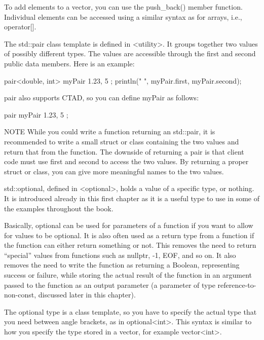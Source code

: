 To add elements to a vector, you can use the push\_back() member function. Individual elements can be accessed using a similar syntax as for arrays, i.e., operator[].


The std::pair class template is defined in <utility>. It groups together two values of possibly different types. The values are accessible through the first and second public data members. Here is an example:

\begin{cpp}
pair<double, int> myPair { 1.23, 5 };
println("{} {}", myPair.first, myPair.second);
\end{cpp}

pair also supports CTAD, so you can define myPair as follows:

\begin{cpp}
pair myPair { 1.23, 5 };
\end{cpp}

\begin{myNotic}{NOTE}
While you could write a function returning an std::pair, it is recommended to write a small struct or class containing the two values and return that from the function. The downside of returning a pair is that client code must use first and second to access the two values. By returning a proper struct or class, you can give more meaningful names to the two values.
\end{myNotic}


std::optional, defined in <optional>, holds a value of a specific type, or nothing. It is introduced already in this first chapter as it is a useful type to use in some of the examples throughout the book.

Basically, optional can be used for parameters of a function if you want to allow for values to be optional. It is also often used as a return type from a function if the function can either return something or not. This removes the need to return “special” values from functions such as nullptr, -1, EOF, and so on. It also removes the need to write the function as returning a Boolean, representing success or failure, while storing the actual result of the function in an argument passed to the function as an output parameter (a parameter of type reference-to-non-const, discussed later in this chapter).

The optional type is a class template, so you have to specify the actual type that you need between angle brackets, as in optional<int>. This syntax is similar to how you specify the type stored in a vector, for example vector<int>.

